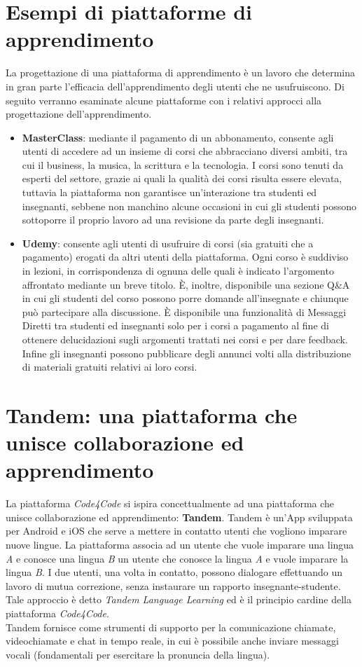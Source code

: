 \section{Esempi di piattaforme di apprendimento}
La progettazione di una piattaforma di apprendimento è un lavoro che determina in gran parte l'efficacia dell'apprendimento degli utenti che ne usufruiscono. Di seguito verranno esaminate alcune piattaforme con i relativi approcci alla progettazione dell'apprendimento.
\begin{itemize}    
    \item{\textbf{MasterClass}: mediante il pagamento di un abbonamento, consente agli utenti di accedere ad un insieme di corsi che abbracciano diversi ambiti, tra cui il business, la musica, la scrittura e la tecnologia. I corsi sono tenuti da esperti del settore, grazie ai quali la qualità dei corsi risulta essere elevata, tuttavia la piattaforma non garantisce un'interazione tra studenti ed insegnanti, sebbene non manchino alcune occasioni in cui gli studenti possono sottoporre il proprio lavoro ad una revisione da parte degli insegnanti.}
    \item{\textbf{Udemy}: consente agli utenti di usufruire di corsi (sia gratuiti che a pagamento) erogati da altri utenti della piattaforma. Ogni corso è suddiviso in lezioni, in corrispondenza di ognuna delle quali è indicato l'argomento affrontato mediante un breve titolo. È, inoltre, disponibile una sezione Q\&A in cui gli studenti del corso possono porre domande all'insegnate e chiunque può partecipare alla discussione. È disponibile una funzionalità di Messaggi Diretti tra studenti ed insegnanti solo per i corsi a pagamento al fine di ottenere delucidazioni sugli argomenti trattati nei corsi e per dare feedback. Infine gli insegnanti possono pubblicare degli annunci volti alla distribuzione di materiali gratuiti relativi ai loro corsi.}
\end{itemize}
\section{Tandem: una piattaforma che unisce collaborazione ed apprendimento}
La piattaforma \emph{Code4Code} si ispira concettualmente ad una piattaforma che unisce collaborazione ed apprendimento: \textbf{Tandem}. Tandem è un'App sviluppata per Android e iOS che serve a mettere in contatto utenti che vogliono imparare nuove lingue. La piattaforma associa ad un utente che vuole imparare una lingua \emph{A} e conosce una lingua \emph{B} un utente che conosce la lingua \emph{A} e vuole imparare la lingua \emph{B}. I due utenti, una volta in contatto, possono dialogare effettuando un lavoro di mutua correzione, senza instaurare un rapporto insegnante-studente. Tale approccio è detto \emph{Tandem Language Learning} \cite{tandem} ed è il principio cardine della piattaforma \emph{Code4Code}.\\Tandem fornisce come strumenti di supporto per la comunicazione chiamate, videochiamate e chat in tempo reale, in cui è possibile anche inviare messaggi vocali (fondamentali per esercitare la pronuncia della lingua). 
